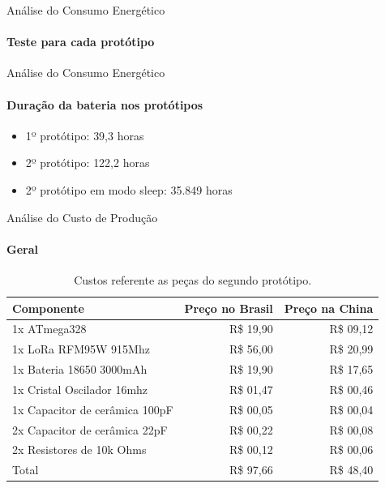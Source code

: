 \begin{frame}{Análise do Consumo Energético}
  \framesubtitle{Teste para cada protótipo}
\end{frame}

\begin{frame}{Análise do Consumo Energético}
  \framesubtitle{Duração da bateria nos protótipos}
  \begin{itemize}
    \item 1º protótipo: \alert{39,3 horas}
    \item 2º protótipo: \alert{122,2 horas}
    \item 2º protótipo em modo sleep: \alert{35.849 horas}
  \end{itemize}
\end{frame}

\begin{frame}{Análise do Custo de Produção}
  \framesubtitle{\textcolor{fibeamer@black}{Geral}}
  \begin{table}[!b]{
    \scalebox{0.9} {
      \carlitoTLF %
      \begin{tabularx}{\textwidth}{lrr}
        \textbf{Componente}&\textbf{Preço no Brasil}&\textbf{Preço na China}\\
        \toprule
        1x ATmega328 & R\$ 19,90 & R\$ 09,12 \\
        1x LoRa RFM95W 915Mhz & R\$ 56,00 & R\$ 20,99 \\
        1x Bateria 18650 3000mAh & R\$ 19,90 & R\$ 17,65 \\
        1x Cristal Oscilador 16mhz & R\$ 01,47 & R\$ 00,46 \\
        1x Capacitor de cerâmica 100pF & R\$ 00,05 & R\$ 00,04 \\
        2x Capacitor de cerâmica 22pF & R\$ 00,22 & R\$ 00,08 \\
        2x Resistores de 10k Ohms & R\$ 00,12 & R\$ 00,06 \\
        \bottomrule
        \textnormal{\alert{Total}} & \alert{R\$ 97,66} & \alert{R\$ 48,40}
      \end{tabularx}
    }
  }
    \caption{Custos referente as peças do segundo protótipo.}
  \end{table}
\end{frame}